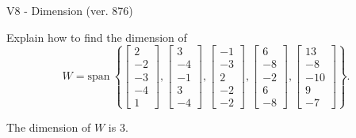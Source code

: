 \begin{exercise}
  \begin{exerciseTitle}V8 - Dimension (ver. 876)\end{exerciseTitle}
  \begin{exerciseStatement}
    Explain how to find the dimension of 
\[W=\mathrm{span}\ \left\{\left[\begin{array}{r}
2 \\
-2 \\
-3 \\
-4 \\
1
\end{array}\right] , \left[\begin{array}{r}
3 \\
-4 \\
-1 \\
3 \\
-4
\end{array}\right] , \left[\begin{array}{r}
-1 \\
-3 \\
2 \\
-2 \\
-2
\end{array}\right] , \left[\begin{array}{r}
6 \\
-8 \\
-2 \\
6 \\
-8
\end{array}\right] , \left[\begin{array}{r}
13 \\
-8 \\
-10 \\
9 \\
-7
\end{array}\right]\right\}.\]



  \end{exerciseStatement}
  \begin{exerciseAnswer}
   The dimension of \(W\) is  \(3\).
  


  \end{exerciseAnswer}
\end{exercise}